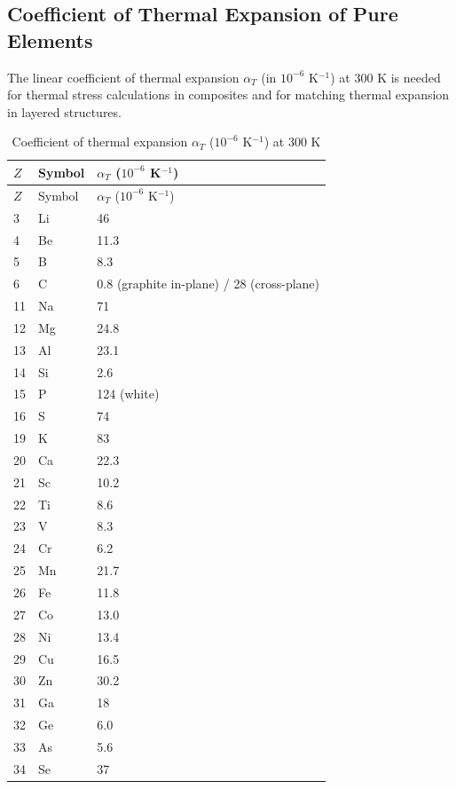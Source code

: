 \documentclass[12pt,a4paper]{article}
\begin{document}
	\subsection{Coefficient of Thermal Expansion of Pure Elements}
	\label{subsec:thermal-expansion}
	
	The linear coefficient of thermal expansion \(\alpha_T\) (in \(10^{-6}\) K\(^{-1}\)) at 300 K is needed for thermal stress calculations in composites and for matching thermal expansion in layered structures.
	
	\begin{longtable}{p{0.6cm}p{1.2cm}p{1.5cm}}
		\caption{Coefficient of thermal expansion $\alpha_T$ ($10^{-6}$ K$^{-1}$) at 300 K} \label{tab:thermal-expansion-all} \\
		\toprule
		$Z$ & Symbol & $\alpha_T$ ($10^{-6}$ K$^{-1}$) \\
		\midrule
		\endfirsthead
		\toprule
		$Z$ & Symbol & $\alpha_T$ ($10^{-6}$ K$^{-1}$) \\
		\midrule
		\endhead
		3  & Li & 46 \\
		4  & Be & 11.3 \\
		5  & B  & 8.3 \\
		6  & C  & 0.8 (graphite in-plane) / 28 (cross-plane) \\
		11 & Na & 71 \\
		12 & Mg & 24.8 \\
		13 & Al & 23.1 \\
		14 & Si & 2.6 \\
		15 & P  & 124 (white) \\
		16 & S  & 74 \\
		19 & K  & 83 \\
		20 & Ca & 22.3 \\
		21 & Sc & 10.2 \\
		22 & Ti & 8.6 \\
		23 & V  & 8.3 \\
		24 & Cr & 6.2 \\
		25 & Mn & 21.7 \\
		26 & Fe & 11.8 \\
		27 & Co & 13.0 \\
		28 & Ni & 13.4 \\
		29 & Cu & 16.5 \\
		30 & Zn & 30.2 \\
		31 & Ga & 18 \\
		32 & Ge & 6.0 \\
		33 & As & 5.6 \\
		34 & Se & 37 \\

\end{longtable}
\end{document}
